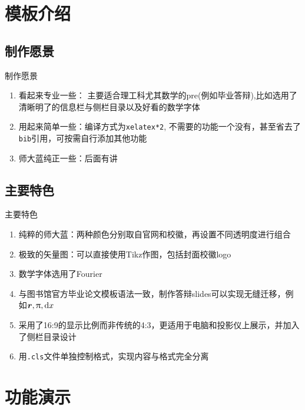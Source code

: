 \documentclass{bnuslides}
\begin{document}
\frame[plain]{\titlepage}

\section{模板介绍}
\subsection{制作愿景}
\begin{frame}{制作愿景}
	\begin{enumerate}
		\item 看起来专业一些： 主要适合理工科尤其数学的pre(例如毕业答辩),比如选用了清晰明了的信息栏与侧栏目录以及好看的数学字体
		\item 用起来简单一些：编译方式为\texttt{xelatex*2}, 不需要的功能一个没有，甚至省去了\texttt{bib}引用，可按需自行添加其他功能
		\item 师大蓝纯正一些：后面有讲
	\end{enumerate}
\end{frame}

\subsection{主要特色}
\begin{frame}{主要特色}
	\begin{enumerate}
		\item 纯粹的师大蓝：两种颜色分别取自官网和校徽，再设置不同透明度进行组合
		\item 极致的矢量图：可以直接使用Tikz作图，包括封面校徽logo
		\item 数学字体选用了Fourier
		\item 与图书馆官方毕业论文模板语法一致，制作答辩slides可以实现无缝迁移，例如$\symbf{r},\uppi,\dif x$
		\item 采用了16:9的显示比例而非传统的4:3，更适用于电脑和投影仪上展示，并加入了侧栏目录设计
		\item 用\texttt{.cls}文件单独控制格式，实现内容与格式完全分离
	\end{enumerate}
\end{frame}

\section{功能演示}
\end{document}
